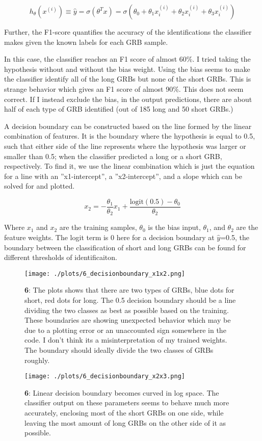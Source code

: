 \begin{equation}
  h_{\theta}(x^{(i)}) \equiv \hat{y} = \sigma(\theta^Tx) = \sigma(\theta_0+\theta_1x_i^{(i)}+\theta_2x_i^{(i)}+\theta_3x_i^{(i)})
\end{equation}

Further, the F1-score quantifies the accuracy of the identifications the classifier makes given the known labels for each GRB sample.

In this case, the classifier reaches an F1 score of almost 60\%. I tried taking the hypothesis without and without the bias weight. Using the bias seems to make the classifier identify all of the long GRBs but none of the short GRBs. This is strange behavior which gives an F1 score of almost 90\%. This does not seem correct. If I instead exclude the bias, in the output predictions, there are about half of each type of GRB identified (out of 185 long and 50 short GRBs.)

A decision boundary can be constructed based on the line formed by the linear combination of features. It is the boundary where the hypothesis is equal to 0.5, such that either side of the line represents where the hypothesis was larger or smaller than 0.5; when the classifier predicted a long or a short GRB, respectively. To find it, we use the linear combination which is just the equation for a line with an ''x1-intercept'', a ''x2-intercept'', and a slope which can be solved for and plotted.

\begin{equation}
  x_2 = -\frac{\theta_1}{\theta_2}x_1 + \frac{\text{logit}(0.5)-\theta_0}{\theta_2}
\end{equation}

Where $x_1$ and $x_2$ are the training samples, $\theta_0$ is the bias input, $\theta_1$, and $\theta_2$ are the feature weights. The logit term is 0 here for a decision boundary at $\hat{y}$=0.5, the boundary between the classification of short and long GRBs can be found for different thresholds of identificaiton.

\begin{figure}[h!]
  \centering
  \texttt{[image: ./plots/6\_decisionboundary\_x1x2.png]}
  \caption{\textbf{6}: The plots shows that there are two types of GRBs, blue dots for short, red dots for long. The 0.5 decision boundary should be a line dividing the two classes as best as possible based on the training. These boundaries are showing unexpected behavior which may be due to a plotting error or an unaccounted sign somewhere in the code. I don't think its a misinterpretation of my trained weights. The boundary should ideally divide the two classes of GRBs roughly.}
  \label{fig:decisionboundary1}
\end{figure}

\begin{figure}[h!]
  \centering
  \texttt{[image: ./plots/6\_decisionboundary\_x2x3.png]}
  \caption{\textbf{6}: Linear decision boundary becomes curved in log space. The classifier output on these parameters seems to behave much more accurately, enclosing most of the short GRBs on one side, while leaving the most amount of long GRBs on the other side of it as possible.}
  \label{fig:decisionboundary2}
\end{figure}
